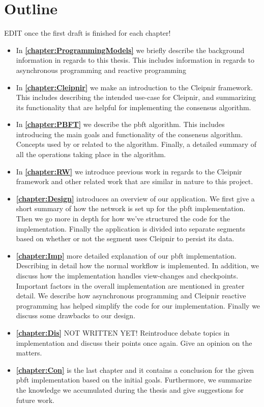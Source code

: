 \section{Outline}
EDIT once the first draft is finished for each chapter!
\begin{itemize}
\item In \textbf{\autoref{chapter:ProgrammingModels}} we briefly describe the background information in regards to this thesis. This includes information in regards to asynchronous programming and reactive programming

\item In \textbf{\autoref{chapter:Cleipnir}} we make an introduction to the Cleipnir framework. This includes describing the intended use-case for Cleipnir, and summarizing its functionality that are helpful for implementing the consensus algorithm.

\item In \textbf{\autoref{chapter:PBFT}} we describe the \ac{pbft} algorithm. This includes introducing the main goals and functionality of the consensus algorithm. Concepts used by or related to the algorithm. Finally, a detailed summary of all the operations taking place in the algorithm.

\item In \textbf{\autoref{chapter:RW}} we introduce previous work in regards to the Cleipnir framework and other related work that are similar in nature to this project.

\item \textbf{\autoref{chapter:Design}} introduces an overview of our application. We first give a short summary of how the network is set up for the \ac{pbft} implementation. Then we go more in depth for how we’ve structured the code for the implementation. Finally the application is divided into separate segments based on whether or not the segment uses Cleipnir to persist its data.

\item \textbf{\autoref{chapter:Imp}} more detailed explanation of our \ac{pbft} implementation. Describing in detail how the normal workflow is implemented. In addition, we discuss how the implementation handles view-changes and checkpoints.  Important factors in the overall implementation are mentioned in greater detail. We describe how asynchronous programming and Cleipnir reactive programming has helped simplify the code for our implementation. Finally we discuss some drawbacks to our design.

\item \textbf{\autoref{chapter:Dis}} NOT WRITTEN YET! Reintroduce debate topics in implementation and discuss their points once again. Give an opinion on the matters.

\item \textbf{\autoref{chapter:Con}} is the last chapter and it contains a conclusion for the given \ac{pbft} implementation based on the initial goals. Furthermore, we summarize the knowledge we accumulated during the thesis and give suggestions for future work.
\end{itemize}